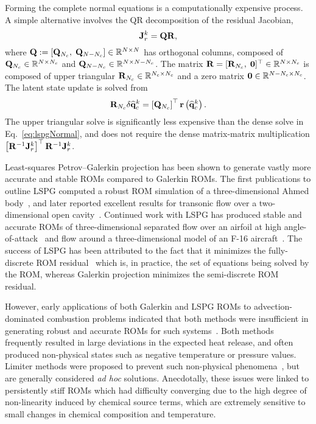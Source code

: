Forming the complete normal equations is a computationally expensive process. A simple alternative involves the QR decomposition of the residual Jacobian,
%
\begin{equation}
    \mathbf{J}_{r}^{k} = \mathbf{QR},
\end{equation}
%
where $\mathbf{Q} := \left[\mathbf{Q}_{N_c}, \; \mathbf{Q}_{N-N_c}\right] \in \mathbb{R}^{N \times N}$ has orthogonal columns, composed of $\mathbf{Q}_{N_c} \in \mathbb{R}^{N \times N_c}$ and $\mathbf{Q}_{N - N_c} \in \mathbb{R}^{N \times N - N_c}$. The matrix $\mathbf{R} = [\mathbf{R}_{N_c}, \; \mathbf{0}]^\top \in \mathbb{R}^{N \times N_c}$ is composed of upper triangular $\mathbf{R}_{N_c} \in \mathbb{R}^{N_c \times N_c}$ and a zero matrix $\mathbf{0} \in \mathbb{R}^{N - N_c \times N_c}$. The latent state update is solved from
%
\begin{equation}
    \mathbf{R}_{N_c} \delta \mathbf{\widehat{q}}_{c}^{k} = \left[\mathbf{Q}_{N_c}\right]^\top \mathbf{r}\left(\mathbf{\widehat{q}}_{c}^{k}\right).
\end{equation}
%
The upper triangular solve is significantly less expensive than the dense solve in Eq.~\ref{eq:lspgNormal}, and does not require the dense matrix-matrix multiplication $\left[\resScaleInv \jacobRes^{\newtonIdx}\right]^\top \resScaleInv \jacobRes^{\newtonIdx}$.

Least-squares Petrov--Galerkin projection has been shown to generate vastly more accurate and stable ROMs compared to Galerkin ROMs. The first publications to outline LSPG computed a robust ROM simulation of a three-dimensional Ahmed body~\cite{Carlberg2010,Carlberg2013}, and later reported excellent results for transonic flow over a two-dimensional open cavity~\cite{Carlberg2017}. Continued work with LSPG has produced stable and accurate ROMs of three-dimensional separated flow over an airfoil at high angle-of-attack~\cite{Grimberg2020Hyper} and flow around a three-dimensional model of an F-16 aircraft~\cite{Grimberg2021}. The success of LSPG has been attributed to the fact that it minimizes the fully-discrete ROM residual~\cite{Grimberg2020} which is, in practice, the set of equations being solved by the ROM, whereas Galerkin projection minimizes the semi-discrete ROM residual.

However, early applications of both Galerkin and LSPG ROMs to advection-dominated combustion problems indicated that both methods were insufficient in generating robust and accurate ROMs for such systems~\cite{Huang2018b,Huang2019}. Both methods frequently resulted in large deviations in the expected heat release, and often produced non-physical states such as negative temperature or pressure values. Limiter methods were proposed to prevent such non-physical phenomena~\cite{Huang2019,Huang2020}, but are generally considered \textit{ad hoc} solutions. Anecdotally, these issues were linked to persistently stiff ROMs which had difficulty converging due to the high degree of non-linearity induced by chemical source terms, which are extremely sensitive to small changes in chemical composition and temperature.